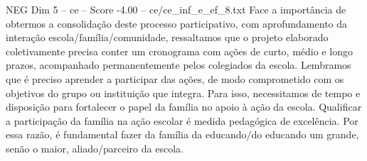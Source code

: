 \begin{textsample}{NEG Dim 5 – ce – Score -4.00 – ce/ce\_inf\_e\_ef\_8.txt}
Face a importância de obtermos a consolidação deste processo participativo, com aprofundamento da interação escola/família/comunidade, ressaltamos que o projeto elaborado coletivamente precisa conter um cronograma com ações de curto, médio e longo prazos, acompanhado permanentemente pelos colegiados da escola.
Lembramos que é preciso aprender a participar das ações, de modo comprometido com os objetivos do grupo ou instituição que integra.
Para isso, necessitamos de tempo e disposição para fortalecer o papel da família no apoio à ação da escola.
Qualificar a participação da família na ação escolar é medida pedagógica de excelência.
Por essa razão, é fundamental fazer da família da educando/do educando um grande, senão o maior, aliado/parceiro da escola.

\end{textsample}
